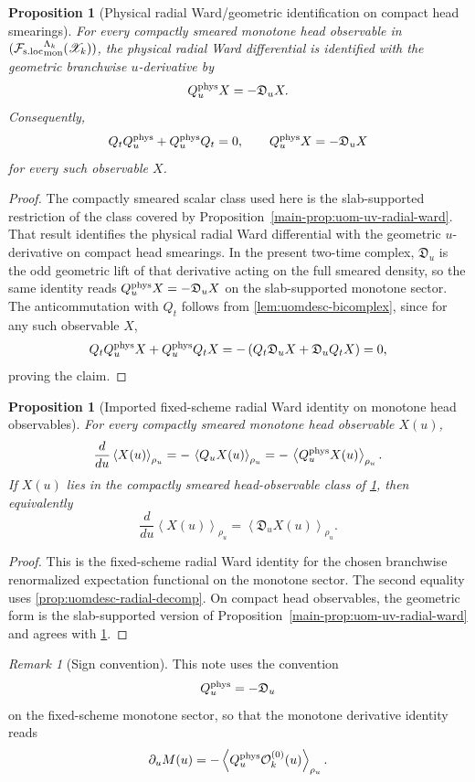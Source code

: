 \documentclass[11pt]{article}
\theoremstyle{definition}
\theoremstyle{plain}
\newtheorem{proposition}[definition]{Proposition}
\theoremstyle{remark}
\newtheorem{remark}[definition]{Remark}
\newcommand{\Fsloc}{\mathcal F_{\rm s.loc}}
\newcommand{\Xscr}{\mathscr X}
\newcommand{\Ozero}{\mathcal O^{(0)}}
\newcommand{\Qt}{Q_t}
\newcommand{\Qu}{Q_u}
\newcommand{\Du}{\mathfrak D_u}
\newcommand{\Quphys}{Q_u^{\rm phys}}
\newcommand{\pair}[1]{\left\langle #1 \right\rangle}
\begin{document}
\begin{proposition}[Physical radial Ward/geometric identification on compact head smearings]
\label{prop:uomdesc-radial-split}
For every compactly smeared monotone head observable in
\(({\Fsloc}_{\rm mon}^{\Lambda_k}(\Xscr_k))\), the physical radial Ward differential is identified
with the geometric branchwise \(u\)-derivative by
\[
\Quphys X=-\Du X.
\]
Consequently,
\[
\Qt\Quphys+\Quphys\Qt=0,
\qquad
\Quphys X=-\Du X
\]
for every such observable \(X\).
\end{proposition}

\begin{proof}
The compactly smeared scalar class used here is the slab-supported restriction of the class covered
by Proposition~\ref{main-prop:uom-uv-radial-ward}.
That result identifies the physical radial Ward differential with the geometric \(u\)-derivative on
compact head smearings.
In the present two-time complex, \(\Du\) is the odd geometric lift of that derivative acting on the
full smeared density, so the same identity reads
\(
\Quphys X=-\Du X
\)
on the slab-supported monotone sector.
The anticommutation with \(\Qt\) follows from \cref{lem:uomdesc-bicomplex}, since for any such
observable \(X\),
\[
\Qt\Quphys X+\Quphys\Qt X
=
-\,(\Qt\Du X+\Du\Qt X)
=
0,
\]
proving the claim.
\end{proof}

\begin{proposition}[Imported fixed-scheme radial Ward identity on monotone head observables]
\label{prop:uomdesc-radial-ward}
For every compactly smeared monotone head observable \(X(u)\),
\[
\frac{d}{du}\pair{X(u)}_{\rho_u}
=
-\,\pair{\Qu X(u)}_{\rho_u}
=
-\,\pair{\Quphys X(u)}_{\rho_u}.
\]
If \(X(u)\) lies in the compactly smeared head-observable class of
\cref{prop:uomdesc-radial-split}, then equivalently
\[
\frac{d}{du}\pair{X(u)}_{\rho_u}
=
\pair{\Du X(u)}_{\rho_u}.
\]
\end{proposition}

\begin{proof}
This is the fixed-scheme radial Ward identity for the chosen branchwise renormalized expectation
functional on the monotone sector.
The second equality uses \cref{prop:uomdesc-radial-decomp}.
On compact head observables, the geometric form is the slab-supported version of
Proposition~\ref{main-prop:uom-uv-radial-ward} and agrees with
\cref{prop:uomdesc-radial-split}.
\end{proof}

\begin{remark}[Sign convention]
\label{rem:uomdesc-sign}
This note uses the convention
\[
\Quphys=-\Du
\]
on the fixed-scheme monotone sector, so that the monotone derivative identity reads
\[
\partial_u M(u)=-\pair{\Quphys\Ozero_k(u)}_{\rho_u}.
\]
\end{remark}
\end{document}
